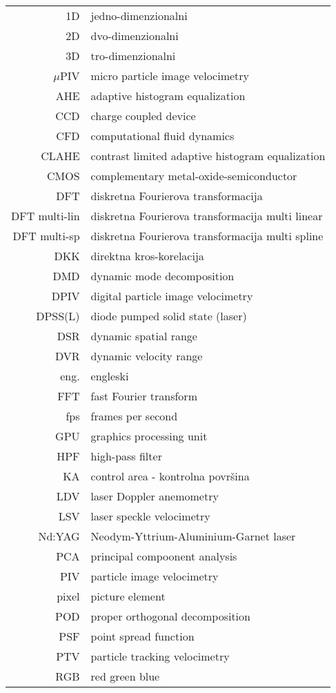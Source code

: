 \begin{flushleft}
\begin{longtable}{rl}
		1D  &  jedno-dimenzionalni\\
		2D  &  dvo-dimenzionalni\\
		3D  &  tro-dimenzionalni\\
		$\mu$PIV & micro particle image velocimetry\\
		AHE & adaptive histogram equalization\\
		CCD & charge coupled device\\
		CFD & computational fluid dynamics\\
		CLAHE & contrast limited adaptive histogram equalization\\
		CMOS & complementary metal-oxide-semiconductor\\
		DFT & diskretna Fourierova transformacija\\
		DFT multi-lin & diskretna Fourierova transformacija multi linear\\
		DFT multi-sp & diskretna Fourierova transformacija multi spline\\
		DKK & direktna kros-korelacija\\
		DMD & dynamic mode decomposition\\
		DPIV & digital particle image velocimetry\\
		DPSS(L) & diode pumped solid state (laser)\\
		DSR & dynamic spatial range\\
		DVR & dynamic velocity range\\
		eng. & engleski \\
		FFT & fast Fourier transform\\
		fps & frames per second\\
		GPU & graphics processing unit\\
		HPF & high-pass filter\\
		KA & control area - kontrolna površina\\
		LDV & laser Doppler anemometry\\
		LSV & laser speckle velocimetry\\
		Nd:YAG & Neodym-Yttrium-Aluminium-Garnet laser\\
		PCA & principal compoonent analysis\\
		PIV & particle image velocimetry\\
		pixel & picture element\\
		POD & proper orthogonal decomposition\\
		PSF & point spread function\\
		PTV & particle tracking velocimetry\\
		RGB & red green blue\\
\end{longtable}
\end{flushleft}
